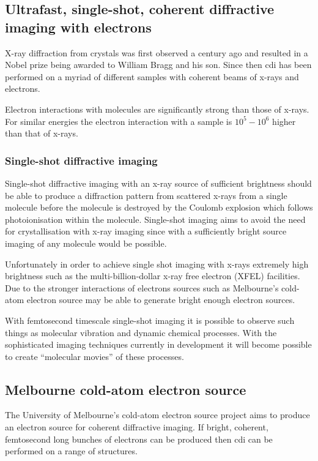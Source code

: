\subsection{Ultrafast, single-shot, coherent diffractive imaging with electrons}
X-ray diffraction from crystals was first observed a century ago\cite{bragg_x-rays_1912} and resulted in a Nobel prize being awarded to William Bragg and his son. Since then \gls{cdi} has been performed on a myriad of different samples with coherent beams of x-rays and electrons.

Electron interactions with molecules are significantly strong than those of x-rays. For similar energies the electron interaction with a sample is $10^5-10^6$ higher than that of x-rays\cite{sciaini_femtosecond_2011}.

\subsubsection{Single-shot diffractive imaging}
Single-shot diffractive imaging with an x-ray source of sufficient brightness should be able to produce a diffraction pattern from scattered x-rays from a single molecule before the molecule is destroyed by the Coulomb explosion which follows photoionisation within the molecule\cite{henderson_potential_1995, neutze_potential_2000}. Single-shot imaging aims to avoid the need for crystallisation with x-ray imaging since with a sufficiently bright source imaging of any molecule would be possible.

Unfortunately in order to achieve single shot imaging with x-rays extremely high brightness such as the multi-billion-dollar x-ray free electron (XFEL) facilities. Due to the stronger interactions of electrons sources such as Melbourne's cold-atom electron source may be able to generate bright enough electron sources.

With femtosecond timescale single-shot imaging it is possible to observe such things as molecular vibration and dynamic chemical processes\cite{zewail_4d_2006}. With the sophisticated imaging techniques currently in development it will become possible to create ``molecular movies''\cite{dwyer_femtosecond_2006} of these processes.

\subsection{Melbourne cold-atom electron source}
The University of Melbourne's cold-atom electron source project aims to produce an electron source for coherent diffractive imaging. If bright, coherent, femtosecond long bunches of electrons can be produced then \gls{cdi} can be performed on a range of structures.

